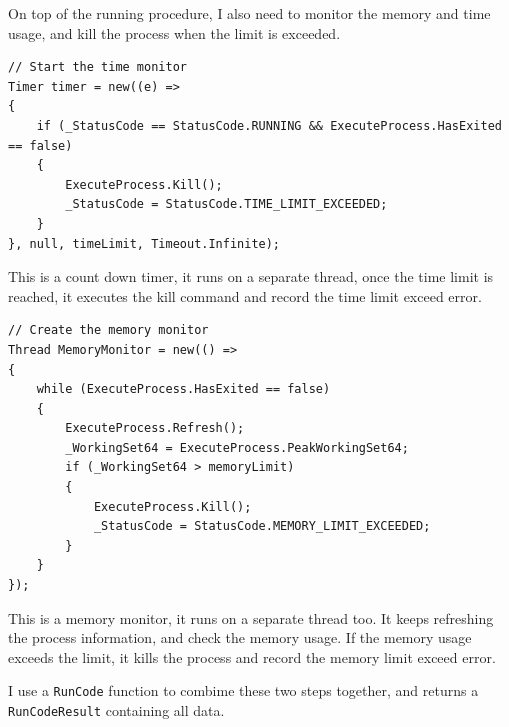 \documentclass[a4paper]{report}
\newcommand{\code}{\texttt}
\begin{document}
On top of the running procedure, I also need to monitor the memory and time usage, and kill the process when the limit is exceeded.

\begin{verbatim}
// Start the time monitor
Timer timer = new((e) =>
{
    if (_StatusCode == StatusCode.RUNNING && ExecuteProcess.HasExited == false)
    {
        ExecuteProcess.Kill();
        _StatusCode = StatusCode.TIME_LIMIT_EXCEEDED;
    }
}, null, timeLimit, Timeout.Infinite);
\end{verbatim}

This is a count down timer, it runs on a separate thread, once the time limit is reached, it executes the kill command and record the time limit exceed error.

\begin{verbatim}
// Create the memory monitor
Thread MemoryMonitor = new(() =>
{
    while (ExecuteProcess.HasExited == false)
    {
        ExecuteProcess.Refresh();
        _WorkingSet64 = ExecuteProcess.PeakWorkingSet64;
        if (_WorkingSet64 > memoryLimit)
        {
            ExecuteProcess.Kill();
            _StatusCode = StatusCode.MEMORY_LIMIT_EXCEEDED;
        }
    }
});
\end{verbatim}

This is a memory monitor, it runs on a separate thread too. It keeps refreshing the process information, and check the memory usage. If the memory usage exceeds the limit, it kills the process and record the memory limit exceed error.

I use a \code{RunCode} function to combime these two steps together, and returns a \code{RunCodeResult} containing all data.
\end{document}
